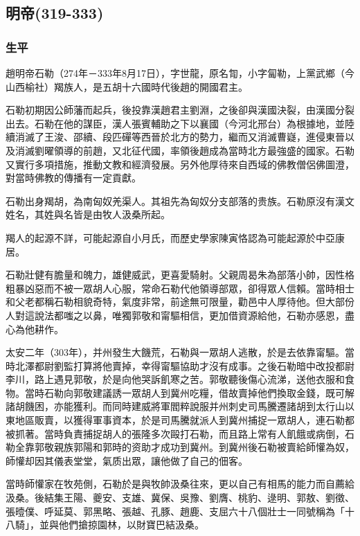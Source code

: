 
\subsection{明帝\tiny(319-333)}

\subsubsection{生平}

趙明帝石勒（274年－333年8月17日），字世龍，原名㔨，小字匐勒，上黨武鄉（今山西榆社）羯族人，是五胡十六國時代後趙的開國君主。

石勒初期因公師藩而起兵，後投靠漢趙君主劉淵，之後卻與漢國決裂，由漢國分裂出去。石勒在他的謀臣，漢人張賓輔助之下以襄國（今河北邢台）為根據地，並陸續消滅了王浚、邵續、段匹磾等西晉於北方的勢力，繼而又消滅曹嶷，進侵東晉以及消滅劉曜領導的前趙，又北征代國，率領後趙成為當時北方最強盛的國家。石勒又實行多項措施，推動文教和經濟發展。另外他厚待來自西域的佛教僧侶佛圖澄，對當時佛教的傳播有一定貢獻。

石勒出身羯胡，為南匈奴羌渠人。其祖先為匈奴分支部落的贵族。石勒原沒有漢文姓名，其姓與名皆是由牧人汲桑所起。

羯人的起源不詳，可能起源自小月氏，而歷史學家陳寅恪認為可能起源於中亞康居。

石勒壯健有膽量和魄力，雄健威武，更喜愛騎射。父親周曷朱為部落小帥，因性格粗暴凶惡而不被一眾胡人心服，常命石勒代他領導部眾，卻得眾人信賴。當時相士和父老都稱石勒相貌奇特，氣度非常，前途無可限量，勸邑中人厚待他。但大部份人對這說法都嗤之以鼻，唯獨郭敬和甯驅相信，更加借資源給他，石勒亦感恩，盡心為他耕作。

太安二年（303年），并州發生大饑荒，石勒與一眾胡人逃散，於是去依靠甯驅。當時北澤都尉劉監打算將他賣掉，幸得甯驅協助才沒有成事。之後石勒暗中改投都尉李川，路上遇見郭敬，於是向他哭訴飢寒之苦。郭敬聽後傷心流涕，送他衣服和食物。當時石勒向郭敬建議誘一眾胡人到冀州吃糧，借故賣掉他們換取金錢，既可解諸胡饑困，亦能獲利。而同時建威將軍閻粹說服并州刺史司馬騰遷諸胡到太行山以東地區販賣，以獲得軍事資本，於是司馬騰就派人到冀州捕捉一眾胡人，連石勒都被抓著。當時負責捕捉胡人的張隆多次毆打石勒，而且路上常有人飢餓或病倒，石勒全靠郭敬親族郭陽和郭時的资助才成功到冀州。到冀州後石勒被賣給師懽為奴，師懽却因其儀表堂堂，氣质出眾，讓他做了自己的佃客。

當時師懽家在牧苑側，石勒於是與牧帥汲桑往來，更以自己有相馬的能力而自薦給汲桑。後結集王陽、夔安、支雄、冀保、吳豫、劉膺、桃豹、逯明、郭敖、劉徵、張曀僕、呼延莫、郭黑略、張越、孔豚、趙鹿、支屈六十八個壯士一同號稱為「十八騎」，並與他們搶掠園林，以財寶巴結汲桑。

